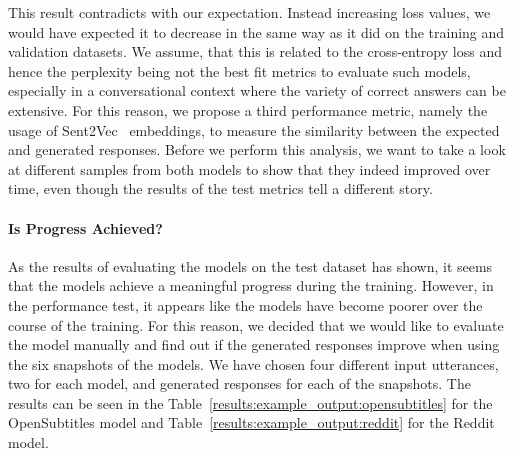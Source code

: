 This result contradicts with our expectation. Instead increasing loss values, we would have expected it to decrease in the same way as it did on the training and validation datasets. We assume, that this is related to the cross-entropy loss and hence the perplexity being not the best fit metrics to evaluate such models, especially in a conversational context where the variety of correct answers can be extensive. For this reason, we propose a third performance metric, namely the usage of Sent2Vec~\cite{Pgj:2017} embeddings, to measure the similarity between the expected and generated responses. Before we perform this analysis, we want to take a look at different samples from both models to show that they indeed improved over time, even though the results of the test metrics tell a different story.

\paragraph{Is Progress Achieved?} As the results of evaluating the models on the test dataset has shown, it seems that the models achieve a meaningful progress during the training. However, in the performance test, it appears like the models have become poorer over the course of the training. For this reason, we decided that we would like to evaluate the model manually and find out if the generated responses improve when using the six snapshots of the models. We have chosen four different input utterances, two for each model, and generated responses for each of the snapshots. The results can be seen in the Table~\ref{results:example_output:opensubtitles} for the OpenSubtitles model and Table~\ref{results:example_output:reddit} for the Reddit model.

